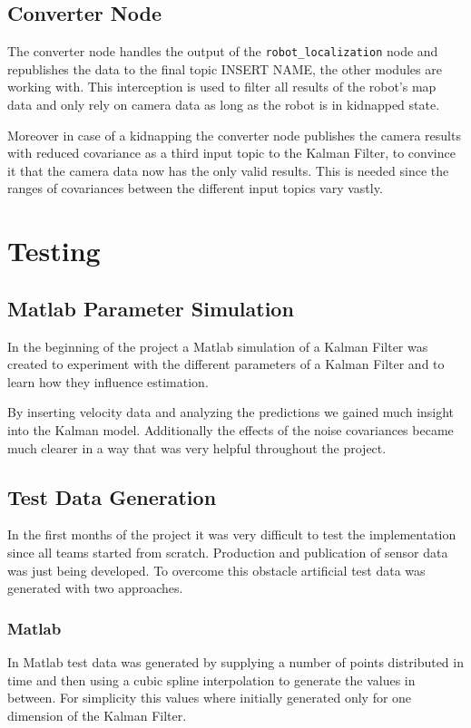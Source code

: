 \subsection{Converter Node}
The converter node handles the output of the \texttt{robot\_localization} node and republishes the data to the final topic INSERT NAME, the other modules are working with. This interception is used to filter all results of the robot's map data and only rely on camera data as long as the robot is in kidnapped state.

Moreover in case of a kidnapping the converter node publishes the camera results with reduced covariance as a third input topic to the Kalman Filter, to convince it that the camera data now has the only valid results. This is needed since the ranges of covariances between the different input topics vary vastly.

\section{Testing}
\subsection{Matlab Parameter Simulation}
In the beginning of the project a Matlab simulation of a Kalman Filter was created to experiment with the different parameters of a Kalman Filter and to learn how they influence estimation.

By inserting velocity data and analyzing the predictions we gained much insight into the Kalman model. Additionally the effects of the noise covariances became much clearer in a way that was very helpful throughout the project.

\subsection{Test Data Generation}
In the first months of the project it was very difficult to test the implementation since all teams started from scratch. Production and publication of sensor data was just being developed. To overcome this obstacle artificial test data was generated with two approaches.

\subsubsection{Matlab}
In Matlab test data was generated by supplying a number of points distributed in time and then using a cubic spline interpolation to generate the values in between. For simplicity this values where initially generated only for one dimension of the Kalman Filter.

